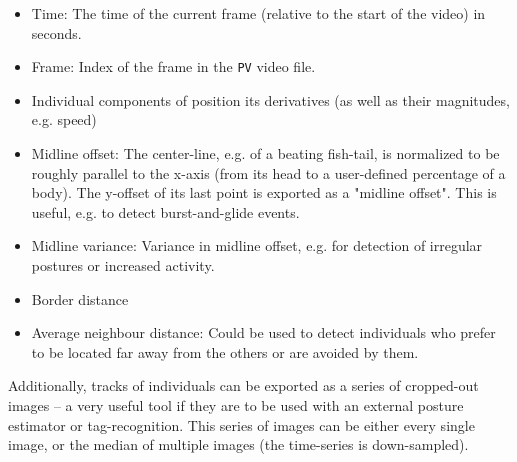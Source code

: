 \documentclass[9pt,lineno]{elife}
\begin{document}
\begin{appendixbox}
\begin{itemize}
\begin{itemize}
            \item Time: The time of the current frame (relative to the start of the video) in seconds.
            \item Frame: Index of the frame in the \texttt{PV} video file.
            \item Individual components of position its derivatives (as well as their magnitudes, e.g. speed)
            \item Midline offset: The center-line, e.g. of a beating fish-tail, is normalized to be roughly parallel to the x-axis (from its head to a user-defined percentage of a body). The y-offset of its last point is exported as a "midline offset". This is useful, e.g. to detect burst-and-glide events.
            \item Midline variance: Variance in midline offset, e.g. for detection of irregular postures or increased activity.
            \item Border distance
            \item Average neighbour distance: Could be used to detect individuals who prefer to be located far away from the others or are avoided by them.
        \end{itemize}
\end{itemize}

Additionally, tracks of individuals can be exported as a series of cropped-out images -- a very useful tool if they are to be used with an external posture estimator or tag-recognition. This series of images can be either every single image, or the median of multiple images (the time-series is down-sampled).
\end{appendixbox}
\end{document}
